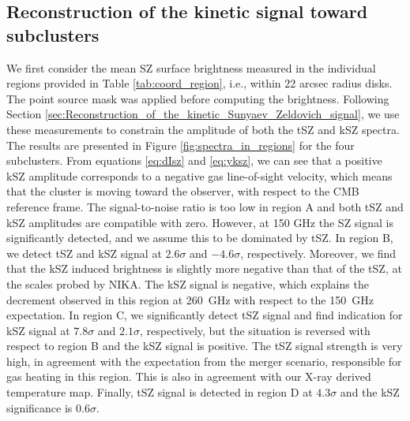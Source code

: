 \documentclass[twocolumn,traditabstract]{aa}
\begin{document}
\subsection{Reconstruction of the kinetic signal toward subclusters}\label{sec:Reconstruction_of_the_kinetic_signal_toward_sub_clusters}
We first consider the mean SZ surface brightness measured in the individual regions provided in Table \ref{tab:coord_region}, i.e., within 22 arcsec radius disks. The point source mask was applied before computing the brightness. Following Section \ref{sec:Reconstruction_of_the_kinetic_Sunyaev_Zeldovich_signal}, we use these measurements to constrain the amplitude of both the tSZ and kSZ spectra. The results are presented in Figure  \ref{fig:spectra_in_regions} for the four subclusters. From equations \ref{eq:dIsz} and \ref{eq:yksz}, we can see that a positive kSZ amplitude corresponds to a negative gas line-of-sight velocity, which means that the cluster is moving toward the observer, with respect to the CMB reference frame. The signal-to-noise ratio is too low in region A and both tSZ and kSZ amplitudes are compatible with zero. However, at 150 GHz  the SZ signal is significantly detected, and we assume this to be dominated by tSZ. In region B, we detect tSZ and kSZ signal at $2.6 \sigma$ and $-4.6 \sigma$, respectively. Moreover, we find that the kSZ induced brightness is slightly more negative than that of the tSZ, at the scales probed by NIKA. The kSZ signal is negative, which explains the decrement observed in this region at 260~GHz with respect to the 150~GHz expectation. In region C, we significantly detect tSZ signal and find indication for kSZ signal at $7.8 \sigma$ and $2.1 \sigma$, respectively, but the situation is reversed with respect to region B and the kSZ signal is positive. The tSZ signal strength is very high, in agreement with the expectation from the merger scenario, responsible for gas heating in this region. This is also in agreement with our X-ray derived temperature map. Finally, tSZ signal is detected in region D at $4.3 \sigma$ and the kSZ significance is $0.6 \sigma$.
\end{document}
